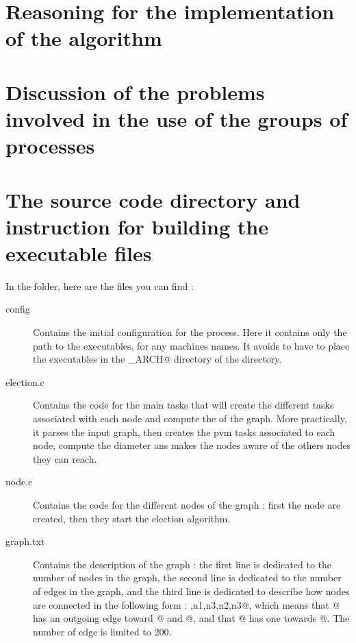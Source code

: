 \documentclass{article}
\begin{document}
\newpage


\section{Reasoning for the implementation of the algorithm}

\section{Discussion of the problems involved in the use of the groups of processes}

\section{The source code directory and instruction for building the executable files}
In the \verb@code@ folder, here are the files you can find : 
\begin{description}
\item[config] Contains the initial configuration for the \verb@pvm@ process. Here it contains only the path to the executables, for any machines names. It avoids to have to place the executables in the \verb@PVM_ARCH@ directory of the \verb@pvm@ directory.
\item[election.c] Contains the code for the main tasks that will create the different \verb@pvm@ tasks associated with each node and compute the \verb@diameter@ of the graph. More practically, it parses the input graph, then creates the pvm tasks associated to each node, compute the diameter ans makes the nodes aware of the others nodes they can reach.
\item[node.c] Contains the code for the different nodes of the graph : first the node are created, then they start the election algorithm.
\item[graph.txt] Contains the description of the graph : the first line is dedicated to the number of nodes in the graph, the second line is dedicated to the number of edges in the graph, and the third line is dedicated to describe how nodes are connected in the following form : ,{n1,n3},{n2,n3}@, which means that @ has an outgoing edge toward @ and @, and that @ has one towards @. The number of edge is limited to 200.
\end{description}
\end{document}
